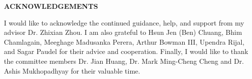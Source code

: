 \newpage
\begin{center}
{\bf ACKNOWLEDGEMENTS}
\end{center}

I would like to acknowledge the continued guidance, help, and support from my advisor Dr. Zhixian Zhou. I am also grateful to Hsun Jen (Ben) Chuang, Bhim Chamlagain, Meeghage Madusanka Perera, Arthur Bowman III, Upendra Rijal, and Sagar Paudel for their advice and cooperation. Finally, I would like to thank the committee members Dr. Jian Huang, Dr. Mark Ming-Cheng Cheng and Dr. Ashis Mukhopadhyay for their valuable time.